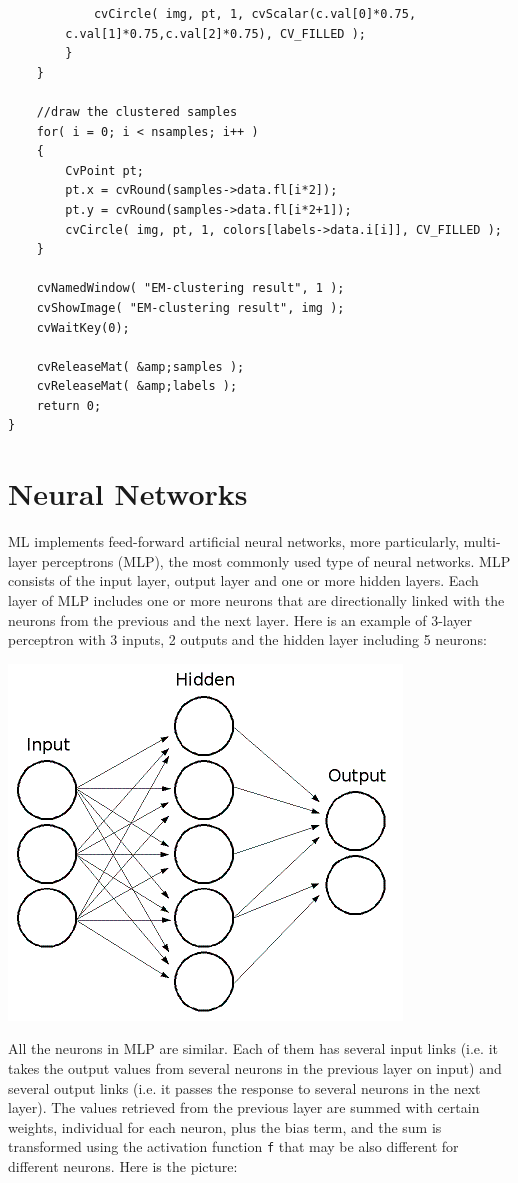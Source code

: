 \begin{lstlisting}
            cvCircle( img, pt, 1, cvScalar(c.val[0]*0.75,
		c.val[1]*0.75,c.val[2]*0.75), CV_FILLED );
        }
    }

    //draw the clustered samples
    for( i = 0; i < nsamples; i++ )
    {
        CvPoint pt;
        pt.x = cvRound(samples->data.fl[i*2]);
        pt.y = cvRound(samples->data.fl[i*2+1]);
        cvCircle( img, pt, 1, colors[labels->data.i[i]], CV_FILLED );
    }

    cvNamedWindow( "EM-clustering result", 1 );
    cvShowImage( "EM-clustering result", img );
    cvWaitKey(0);

    cvReleaseMat( &amp;samples );
    cvReleaseMat( &amp;labels );
    return 0;
}

\end{lstlisting}

\section{Neural Networks}

ML implements feed-forward artificial neural networks, more particularly, multi-layer perceptrons (MLP), the most commonly used type of neural networks. MLP consists of the input layer, output layer and one or more hidden layers. Each layer of MLP includes one or more neurons that are directionally linked with the neurons from the previous and the next layer. Here is an example of 3-layer perceptron with 3 inputs, 2 outputs and the hidden layer including 5 neurons:

\includegraphics{pics/mlp_.png}

All the neurons in MLP are similar. Each of them has several input links (i.e. it takes the output values from several neurons in the previous layer on input) and several output links (i.e. it passes the response to several neurons in the next layer). The values retrieved from the previous layer are summed with certain weights, individual for each neuron, plus the bias term, and the sum is transformed using the activation function \texttt{f} that may be also different for different neurons. Here is the picture:

